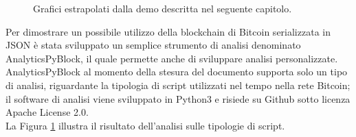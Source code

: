 \begin{figure}
	\centering
	\caption{Grafici estrapolati dalla demo descritta nel seguente capitolo.}
	\label{fig:analisisScript}
\end{figure}

Per dimostrare un possibile utilizzo della blockchain di Bitcoin serializzata in JSON è stata sviluppato un semplice strumento di analisi denominato AnalyticsPyBlock, il quale permette anche di sviluppare analisi personalizzate.\\
AnalyticsPyBlock al momento della stesura del documento supporta solo un tipo di analisi, riguardante la tipologia di script utilizzati nel tempo nella rete Bitcoin; il software di analisi viene sviluppato in Python3 e risiede su Github sotto licenza Apache License 2.0.\\
La Figura \ref{fig:analisisScript} illustra il risultato dell'analisi sulle tipologie di script.


